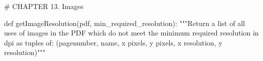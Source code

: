 # CHAPTER 13. Images

def getImageResolution(pdf, min_required_resolution):
    """Return a list of all uses of images in the PDF which do not meet the
    minimum required resolution in dpi as tuples of:
    (pagenumber, name, x pixels, y pixels, x resolution, y resolution)"""
